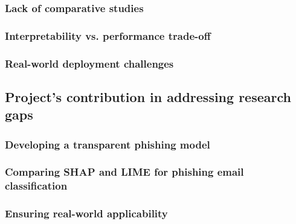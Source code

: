 \subsubsection*{Lack of comparative studies}

\subsubsection*{Interpretability vs. performance trade-off}

\subsubsection*{Real-world deployment challenges}

\newpage

\subsection*{Project's contribution in addressing research gaps}

\subsubsection*{Developing a transparent phishing model}

\subsubsection*{Comparing SHAP and LIME for phishing email classification}

\subsubsection*{Ensuring real-world applicability}
